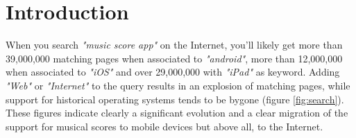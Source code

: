 \documentclass{article}
\title{\papertitle}
\begin{document}
%
\capstartfalse
\maketitle
\capstarttrue
%
\begin{abstract}
Music notation is facing new musical forms such as electronic and/or interactive music, live coding, hybridizations with dance, design, multimedia. It is also facing the migration of musical instruments to gestural and mobile platforms, which poses the question of new scores usages on devices that mostly lack the necessary graphic space to display the music in a traditional setting and approach. Music scores distributed and shared on the Internet start also to be the support of innovative musical practices, which raises other issues, notably regarding dynamic and collaborative music scores. 
This paper introduces some of the perspectives opened by the migration of music scores to mobile platforms and to the Internet and it presents the approach adopted with INScore, an environment for the design of augmented, interactive music scores.
\end{abstract}
%

\section{Introduction}\label{intro}

When you search \emph{"music score app"} on the Internet, you'll likely get more than 39,000,000 matching pages when associated to \emph{"android"}, more than 12,000,000 when associated to \emph{"iOS"} and over 29,000,000 with \emph{"iPad"} as keyword. Adding \emph{"Web"} or \emph{"Internet"} to the query results in an explosion of matching pages, while support for historical operating systems tends to be bygone (figure \ref{fig:search}). These figures indicate clearly a significant evolution and a clear migration of the support for musical scores to mobile devices but above all, to the Internet.
\end{document}
